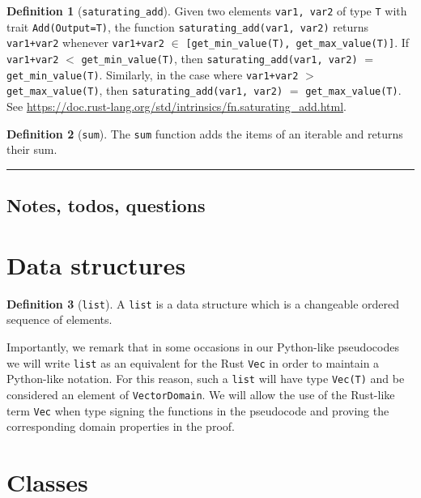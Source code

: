\documentclass[11pt,a4paper]{article}
\theoremstyle{definition}
\newtheorem{definition}{Definition}[section]
\newcommand{\horizline}{\noindent\rule{\textwidth}{1pt}}
\newcommand{\inRust}[2]{See \url{#2}.}
\begin{document}
\begin{definition}[\texttt{saturating\_add}]
    Given two elements \texttt{var1, var2} of type \texttt{T} with trait \texttt{Add(Output=T)}, the function  \texttt{saturating\_add(var1, var2)} returns \texttt{var1+var2} whenever \texttt{var1+var2} $\in$ \texttt{[get\_min\_value(T), get\_max\_value(T)]}. If \texttt{var1+var2} $<$ \texttt{get\_min\_value(T)}, then \texttt{saturating\_add(var1, var2)} $=$ \texttt{get\_min\_value(T)}. Similarly, in the case where \texttt{var1+var2} $>$ \texttt{get\_max\_value(T)}, then \texttt{saturating\_add(var1, var2)} $=$ \texttt{get\_max\_value(T)}. \inRust{std::intrinsics::saturating\_add}{https://doc.rust-lang.org/std/intrinsics/fn.saturating_add.html}
\end{definition}

\begin{definition}[\texttt{sum}]
    The \texttt{sum} function adds the items of an iterable and returns their sum.
\end{definition}

\horizline

\subsection{Notes, todos, questions}


\section{Data structures}

\begin{definition}[\texttt{list}]
    A \texttt{list} is a data structure which is a changeable ordered sequence of elements.
\end{definition}

Importantly, we remark that in some occasions in our Python-like pseudocodes we will write \texttt{list} as an equivalent for the Rust \texttt{Vec} in order to maintain a Python-like notation. For this reason, such a \texttt{list} will have type \texttt{Vec(T)} and be considered an element of \texttt{VectorDomain}. We will allow the use of the Rust-like term \texttt{Vec} when type signing the functions in the pseudocode and proving the corresponding domain properties in the proof.

\section{Classes}
\end{document}
